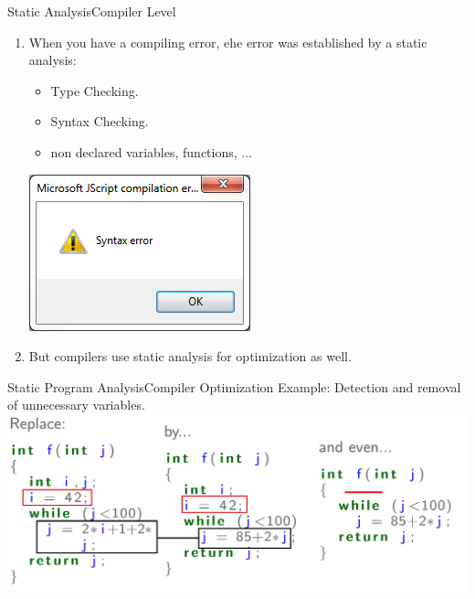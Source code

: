 \begin{frame}{Static Analysis}{Compiler Level}
\begin{enumerate}
\item When you have a compiling error, ehe error was established by a static analysis:
\begin{itemize}
	\item Type Checking.
	\item Syntax Checking. 
	\item non declared variables, functions, ...
\end{itemize}
\centering \includegraphics[scale=0.50]{content/images/static-analysis/syntaxerr.png}
\item But compilers use static analysis for optimization as well.
\end{enumerate}
\end{frame}

\begin{frame}{Static Program Analysis}{Compiler Optimization}
Example: Detection and removal of unnecessary variables.
	\centering
	\includegraphics[scale=0.37]{content/images/static-analysis/compiler.png}

\end{frame}




